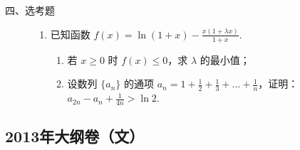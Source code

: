 \begin{description}

    \item[四、选考题]

    \begin{enumerate}[leftmargin=5pt]

      \addtocounter{enumi}{+21}

        \item 已知函数 \(f(x)=\ln\left(1+x\right)-\frac{x(1+\lambda x)}{1+x}\).

\begin{enumerate}
\item 若 \(x\geqslant0\) 时 \(f(x)\leqslant0\)，求 \(\lambda\) 的最小值；
\item 设数列 \(\{a_n\}\) 的通项 \(a_n=1+\frac{1}{2}+\frac{1}{3}+\dots+\frac{1}{n}\)，证明：\(a_{2n}-a_n+\frac{1}{4n}>\ln2\).
\end{enumerate}

    \end{enumerate}

\end{description}


\subsection{2013年大纲卷（文）}\label{gk:2013年大纲卷（文）}

